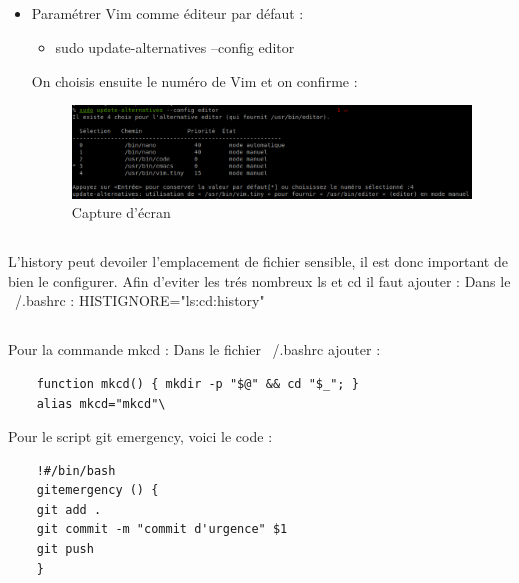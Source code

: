 \documentclass{article}
\begin{document}
\subsection{}
\begin{itemize}
    \item Paramétrer Vim comme éditeur par défaut :
    \begin{itemize}
        \item sudo update-alternatives --config editor
    \end{itemize}
    On choisis ensuite le numéro de Vim et on confirme :
    \begin{figure}
\centering
    \includegraphics[width=\textwidth]{screen/Exo1-3.png}
    \caption{\label{fig:frog}Capture d'écran}
\end{figure}
\end{itemize}
\subsection{}
L'history peut devoiler l'emplacement de fichier sensible, il est donc important de bien le configurer.
Afin d'eviter les trés nombreux ls et cd il faut ajouter :
Dans le ~/.bashrc : HISTIGNORE="ls:cd:history"\\

\subsection{}
Pour la commande mkcd :
Dans le fichier ~/.bashrc ajouter :
\begin{lstlisting}
    function mkcd() { mkdir -p "$@" && cd "$_"; }
    alias mkcd="mkcd"\
\end{lstlisting}
Pour le script git emergency, voici le code :
\begin{lstlisting}
    !#/bin/bash
    gitemergency () {
	git add .
	git commit -m "commit d'urgence" $1
	git push
    }
    \end{lstlisting}
\end{document}
